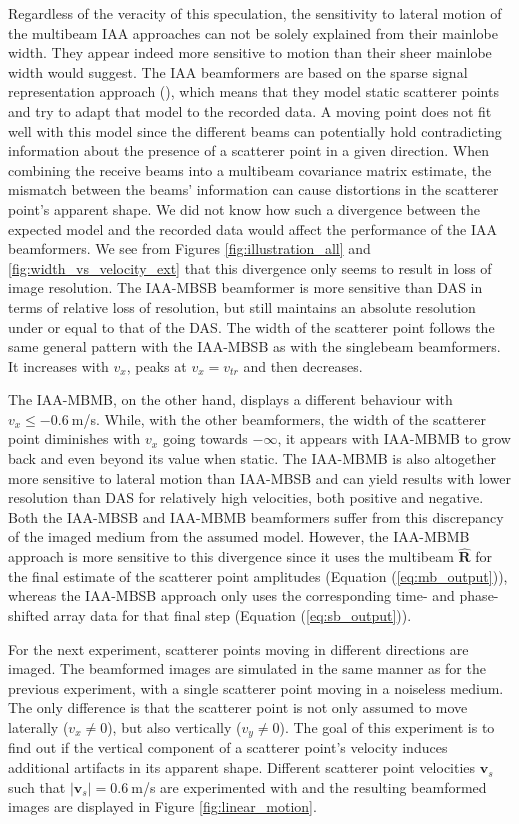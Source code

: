 Regardless of the veracity of this speculation, the sensitivity to lateral motion of the multibeam IAA approaches can not be solely explained from their mainlobe width. They appear indeed more sensitive to motion than their sheer mainlobe width would suggest.
The IAA beamformers are based on the sparse signal representation approach (\cite{Yardibi_nonparametric_IAA}), which means that they model static scatterer points and try to adapt that model to the recorded data.
A moving point does not fit well with this model since the different beams can potentially hold contradicting information about the presence of a scatterer point in a given direction.
When combining the receive beams into a multibeam covariance matrix estimate, the mismatch between the beams' information can cause distortions in the scatterer point's apparent shape.
We did not know how such a divergence between the expected model and the recorded data would affect the performance of the IAA beamformers.
We see from Figures \ref{fig:illustration_all} and \ref{fig:width_vs_velocity_ext} that this divergence only seems to result in loss of image resolution.
The IAA-MBSB beamformer is more sensitive than DAS in terms of relative loss of resolution, but still maintains an absolute resolution under or equal to that of the DAS.
The width of the scatterer point follows the same general pattern with the IAA-MBSB as with the singlebeam beamformers.
It increases with $v_x$, peaks at $v_x = v_{tr}$ and then decreases.

The IAA-MBMB, on the other hand, displays a different behaviour with $v_x \leq -0.6~$m/s. While, with the other beamformers, the width of the scatterer point diminishes with $v_x$ going towards $-\infty$, it appears with IAA-MBMB to grow back and even beyond its value when static.
The IAA-MBMB is also altogether more sensitive to lateral motion than IAA-MBSB and can yield results with lower resolution than DAS for relatively high velocities, both positive and negative.
Both the IAA-MBSB and IAA-MBMB beamformers suffer from this discrepancy of the imaged medium from the assumed model. However, the IAA-MBMB approach is more sensitive to this divergence since it uses the multibeam $\boldsymbol{\hat{R}}$ for the final estimate of the scatterer point amplitudes (Equation (\ref{eq:mb_output})), whereas the IAA-MBSB approach only uses the corresponding time- and phase-shifted array data for that final step (Equation (\ref{eq:sb_output})).

For the next experiment, scatterer points moving in different directions are imaged. The beamformed images are simulated in the same manner as for the previous experiment, with a single scatterer point moving in a noiseless medium. The only difference is that the scatterer point is not only assumed to move laterally ($v_x \neq 0$), but also vertically ($v_y \neq 0$). The goal of this experiment is to find out if the vertical component of a scatterer point's velocity induces additional artifacts in its apparent shape. Different scatterer point velocities $\boldsymbol{v}_s$  such that $|\boldsymbol{v}_s| = 0.6~$m/s are experimented with and the resulting beamformed images are displayed in Figure \ref{fig:linear_motion}.

